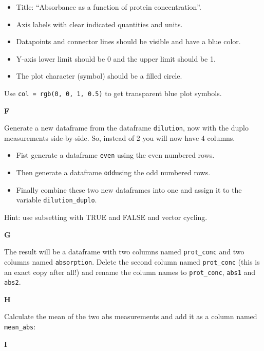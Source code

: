 \documentclass[]{book}
\providecommand{\tightlist}{%
  \setlength{\itemsep}{0pt}\setlength{\parskip}{0pt}}
\begin{document}
\begin{itemize}
\tightlist
\item
  Title: ``Absorbance as a function of protein concentration''.\\
\item
  Axis labels with clear indicated quantities and units.\\
\item
  Datapoints and connector lines should be visible and have a blue color.\\
\item
  Y-axis lower limit should be 0 and the upper limit should be 1.\\
\item
  The plot character (symbol) should be a filled circle.
\end{itemize}

Use \texttt{col\ =\ rgb(0,\ 0,\ 1,\ 0.5)} to get transparent blue plot symbols.

\textbf{F}

Generate a new dataframe from the dataframe \texttt{dilution}, now with the duplo measurements side-by-side. So, instead of 2 you will now have 4 columns.

\begin{itemize}
\tightlist
\item
  Fist generate a dataframe \texttt{even} using the even numbered rows.\\
\item
  Then generate a dataframe \texttt{odd}using the odd numbered rows.\\
\item
  Finally combine these two new dataframes into one and assign it to the variable \texttt{dilution\_duplo}.
\end{itemize}

Hint: use subsetting with TRUE and FALSE and vector cycling.

\textbf{G}

The result will be a dataframe with two columns named \texttt{prot\_conc} and two columns named \texttt{absorption}. Delete the second column named \texttt{prot\_conc} (this is an exact copy after all!) and rename the column names to \texttt{prot\_conc}, \texttt{abs1} and \texttt{abs2}.

\textbf{H}

Calculate the mean of the two abs measurements and add it as a column named \texttt{mean\_abs}:

\textbf{I}
\end{document}
